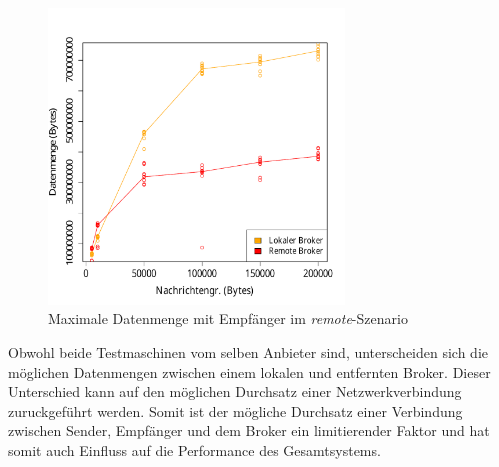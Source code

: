 \begin{figure}
\center
 \includegraphics[width=0.7\textwidth]{images/measurement/rate-limit-unlimited-AvsB.pdf}
  \caption{Maximale Datenmenge mit Empfänger im \textit{remote}-Szenario}
  \label{img:maxByteThroughputB}
\end{figure}
Obwohl beide Testmaschinen vom selben Anbieter sind, unterscheiden sich die möglichen Datenmengen zwischen einem lokalen und entfernten Broker. Dieser Unterschied kann auf den möglichen Durchsatz einer Netzwerkverbindung zuruckgeführt werden. Somit ist der mögliche Durchsatz einer Verbindung zwischen Sender, Empfänger und dem Broker ein limitierender Faktor und hat somit auch Einfluss auf die Performance des Gesamtsystems.

